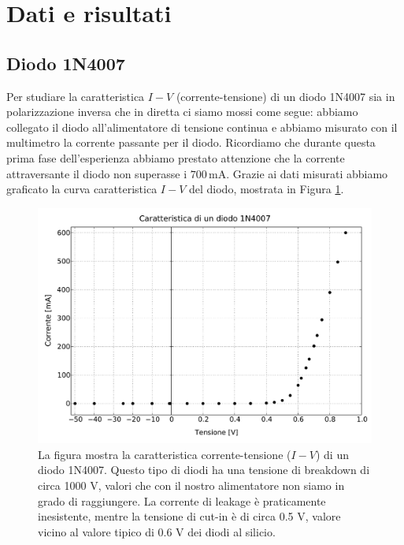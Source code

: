 \section*{Dati e risultati}

\subsection{Diodo 1N4007}

Per studiare la caratteristica $I-V$ (corrente-tensione) di un diodo 1N4007 sia in polarizzazione inversa che in diretta ci siamo mossi come segue: abbiamo collegato il diodo all'alimentatore di tensione continua e abbiamo misurato con il multimetro la corrente passante per il diodo.
Ricordiamo che durante questa prima fase dell'esperienza abbiamo prestato attenzione che la corrente attraversante il diodo non superasse i $700\,\si{\milli\ampere}$.
Grazie ai dati misurati abbiamo graficato la curva caratteristica $I-V$ del diodo, mostrata in Figura \ref{fig:diodo}.

\begin{figure}
    \includegraphics[scale=0.50]{diodo.pdf}
    \caption{La figura mostra la caratteristica corrente-tensione ($I-V$) di un diodo 1N4007. Questo tipo di diodi ha una tensione di breakdown di circa 1000 V, valori che con il nostro alimentatore non siamo in grado di raggiungere.
    La corrente di leakage è praticamente inesistente, mentre la tensione di cut-in è di circa 0.5 V, valore vicino al valore tipico di 0.6 V dei diodi al silicio. }
    \label{fig:diodo}
\end{figure}

